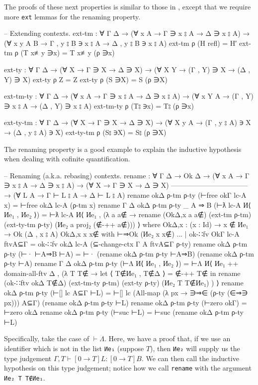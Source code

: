 \documentclass[logo,bsc,singlespacing,parskip,online]{infthesis}
\begin{document}
The proofs of these next properties is similar to those in \citet{wadler_programming_2022}, except
that we require more \texttt{ext} lemmas for the renaming property.
\begin{code}
  -- Extending contexts.
  ext-tm : ∀ {Γ Δ}
    → (∀ {x A}     →        Γ ∋ x ⦂ A →         Δ ∋ x ⦂ A)
    → (∀ {x y A B} → Γ , y ⦂ B ∋ x ⦂ A → Δ , y ⦂ B ∋ x ⦂ A)
  ext-tm ρ (H refl) = H′
  ext-tm ρ (T x≢y ∋x) = T x≢y (ρ ∋x)

  ext-ty : ∀ {Γ Δ}
    → (∀ {X}   →       Γ ∋ X →       Δ ∋ X)
    → (∀ {X Y} → (Γ , Y) ∋ X → (Δ , Y) ∋ X)
  ext-ty ρ Z = Z
  ext-ty ρ (S ∋X) = S (ρ ∋X)

  ext-tm-ty : ∀ {Γ Δ}
    → (∀ {x A}   →       Γ ∋ x ⦂ A →       Δ ∋ x ⦂ A)
    → (∀ {x Y A} → (Γ , Y) ∋ x ⦂ A → (Δ , Y) ∋ x ⦂ A)
  ext-tm-ty ρ (T⦂ ∋x) = T⦂ (ρ ∋x)

  ext-ty-tm : ∀ {Γ Δ}
    → (∀ {X}     →          Γ ∋ X →           Δ ∋ X)
    → (∀ {X y A} → (Γ , y ⦂ A) ∋ X → (Δ , y ⦂ A) ∋ X)
  ext-ty-tm ρ (S⦂ ∋X) = S⦂ (ρ ∋X)
\end{code}

The renaming property is a good example to explain the inductive hypothesis when dealing with
cofinite quantification.
\begin{code}
  -- Renaming (a.k.a. rebasing) contexts.
  rename : ∀ {Γ Δ}
    → Ok Δ
    → (∀ {x A} → Γ ∋ x ⦂ A → Δ ∋ x ⦂ A)
    → (∀ {X} → Γ ∋ X → Δ ∋ X)
      ---------------------------------
    → (∀ {L A} → Γ ⊢ L ⦂ A → Δ ⊢ L ⦂ A)
  rename okΔ ρ-tm ρ-ty (⊢free okΓ lc-A x) = ⊢free okΔ lc-A (ρ-tm x)
  rename {Γ} {Δ} okΔ ρ-tm ρ-ty {_} {A ⇒ B} (⊢ƛ lc-A И⟨ Иe₁ , Иe₂ ⟩) =
    ⊢ƛ lc-A И⟨ Иe₁ , (λ a {a∉} →
      rename
        (OkΔ,x a a∉)
        (ext-tm ρ-tm)
        (ext-ty-tm ρ-ty)
        (Иe₂ a {proj₂ (∉-++ a∉)})) ⟩
    where
      OkΔ,x : (x : Id) → x ∉ Иe₁ → Ok (Δ , x ⦂ A)
      OkΔ,x x x∉ with ⊢⇒Ok (Иe₂ x {x∉})
      ... | ok-∷fv OkΓ lc-A ftvA⊆Γ =
        ok-∷fv okΔ lc-A (⊆-change-ctx {Γ} {A} ftvA⊆Γ ρ-ty)
  rename okΔ ρ-tm ρ-ty (⊢· ⊢A⇒B ⊢A) =
    ⊢· (rename okΔ ρ-tm ρ-ty ⊢A⇒B) (rename okΔ ρ-tm ρ-ty ⊢A)
  rename {Γ} {Δ} okΔ ρ-tm ρ-ty (⊢Λ И⟨ Иe₁ , Иe₂ ⟩) =
    ⊢Λ И⟨ Иe₁ ++ domain-all-ftv Δ , (λ T {T∉} →
      let ⟨ T∉Иe₁ , T∉Δ ⟩ = ∉-++ T∉
      in rename
        (ok-∷ftv okΔ T∉Δ)
        (ext-tm-ty ρ-tm)
        (ext-ty ρ-ty)
        (Иe₂ T {T∉Иe₁}) ) ⟩
  rename okΔ ρ-tm ρ-ty (⊢[] lc A⊆Γ ⊢L) = ⊢[]
    lc
    (All-map (λ px → ∋⇒∈ (ρ-ty (∈⇒∋ px))) A⊆Γ)
    (rename okΔ ρ-tm ρ-ty ⊢L)
  rename okΔ ρ-tm ρ-ty (⊢zero okΓ) = ⊢zero okΔ
  rename okΔ ρ-tm ρ-ty (⊢suc ⊢L) = ⊢suc (rename okΔ ρ-tm ρ-ty ⊢L)
\end{code}
Specifically, take the case of $\vdash\Lambda$. Here, we have a proof that, if we use an identifier
which is not in the list \texttt{Иe₁} (suppose $T$), then \texttt{Иe₂} will supply us the type
judgement $\Gamma , T \vdash [0 \to T] L \colon [0 \to T] B$. We can then call the inductive
hypothesis on this type judgement; notice how we call \texttt{rename} with the argument \texttt{Иe₂
T {T∉Иe₁}}.
\end{document}
